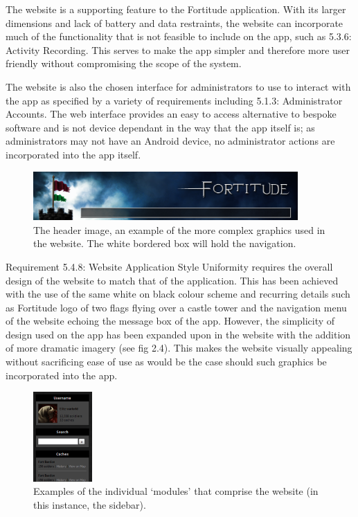 The website is a supporting feature to the Fortitude application. With its larger dimensions and lack of battery and data restraints, the website can incorporate much of the functionality that is not feasible to include on the app, such as 5.3.6: Activity Recording. This serves to make the app simpler and therefore more user friendly without compromising the scope of the system.

The website is also the chosen interface for administrators to use to interact with the app as specified by a variety of requirements including 5.1.3: Administrator Accounts. The web interface provides an easy to access alternative to bespoke software and is not device dependant in the way that the app itself is; as administrators may not have an Android device, no administrator actions are incorporated into the app itself.

\begin{figure}
	\vspace{-20pt}
	\includegraphics[width=0.9\textwidth]{images/website_header_background}
	\caption{The header image, an example of the more complex graphics used in the website. The white bordered box will hold the navigation.}
	\vspace{-10pt}
\end{figure}

Requirement 5.4.8: Website Application Style Uniformity requires the overall design of the website to match that of the application. This has been achieved with the use of the same white on black colour scheme and recurring details such as Fortitude logo of two flags flying over a castle tower and the navigation menu of the website echoing the message box of the app. However, the simplicity of design used on the app has been expanded upon in the website with the addition of more dramatic imagery (see fig 2.4). This makes the website visually appealing without sacrificing ease of use as would be the case should such graphics be incorporated into the app.

\begin{figure}
	\vspace{-20pt}
	\begin{center}
	\includegraphics[width=0.2\textwidth]{images/sidebar_modules}
	\caption{Examples of the individual ‘modules’ that comprise the website (in this instance, the sidebar).}
	\end{center}
	\vspace{-20pt}
\end{figure}

